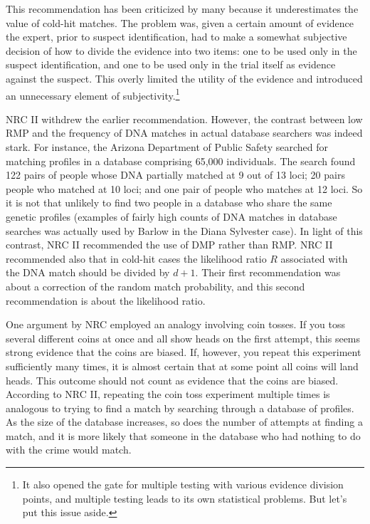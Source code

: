 \documentclass[10pt,dvipsnames,enabledeprecatedfontcommands]{scrartcl}
\begin{document}
This recommendation has been criticized by many because it
underestimates the value of cold-hit matches. The problem was, given a
certain amount of evidence the expert, prior to suspect identification,
had to make a somewhat subjective decision of how to divide the evidence
into two items: one to be used only in the suspect identification, and
one to be used only in the trial itself as evidence against the suspect.
This overly limited the utility of the evidence and introduced an
unnecessary element of
subjectivity.\footnote{It also opened the gate for multiple testing with various evidence division points, and multiple testing leads to its own statistical problems. But let's put this issue aside.}

NRC II withdrew the earlier recommendation. However, the contrast
between low RMP and the frequency of DNA matches in actual database
searchers was indeed stark. For instance, the Arizona Department of
Public Safety searched for matching profiles in a database comprising
65,000 individuals. The search found 122 pairs of people whose DNA
partially matched at 9 out of 13 loci; 20 pairs people who matched at 10
loci; and one pair of people who matches at 12 loci. So it is not that
unlikely to find two people in a database who share the same genetic
profiles (examples of fairly high counts of DNA matches in database
searches was actually used by Barlow in the Diana Sylvester case). In
light of this contrast, NRC II recommended the use of DMP rather than
RMP. NRC II recommended also that in cold-hit cases the likelihood ratio
\(R\) associated with the DNA match should be divided by \(d+1\). Their
first recommendation was about a correction of the random match
probability, and this second recommendation is about the likelihood
ratio.


One argument by NRC employed an analogy involving coin tosses. If you
toss several different coins at once and all show heads on the first
attempt, this seems strong evidence that the coins are biased. If,
however, you repeat this experiment sufficiently many times, it is
almost certain that at some point all coins will land heads. This
outcome should not count as evidence that the coins are biased.
According to NRC II, repeating the coin toss experiment multiple times
is analogous to trying to find a match by searching through a database
of profiles. As the size of the database increases, so does the number
of attempts at finding a match, and it is more likely that someone in
the database who had nothing to do with the crime would match.
\end{document}
